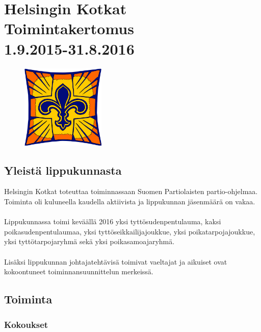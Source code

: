 \documentclass[a4paper, 12pt, finnish]{report} %
\begin{document}
\chapter{Helsingin Kotkat\\Toimintakertomus\\1.9.2015-31.8.2016}

\begin{figure}[htb]
	\begin{center}
		\includegraphics[height=4cm]{heko.png}
	\end{center}
\end{figure}


\section{Yleistä lippukunnasta}
Helsingin Kotkat toteuttaa toiminnassaan Suomen Partiolaisten partio-ohjelmaa. Toiminta oli kuluneella kaudella aktiivista ja lippukunnan jäsenmäärä on vakaa.\\
\\Lippukunnassa toimi keväällä 2016 yksi tyttösudenpentulauma, kaksi poikasudenpentulaumaa, yksi tyttöseikkailijajoukkue, yksi poikatarpojajoukkue, yksi tyttötarpojaryhmä sekä yksi poikasamoajaryhmä.\\
\\Lisäksi lippukunnan johtajatehtävisä toimivat vaeltajat ja aikuiset ovat kokoontuneet toiminnansuunnittelun merkeissä.
\newpage
\section{Toiminta}
\subsection{Kokoukset}
\end{document}
